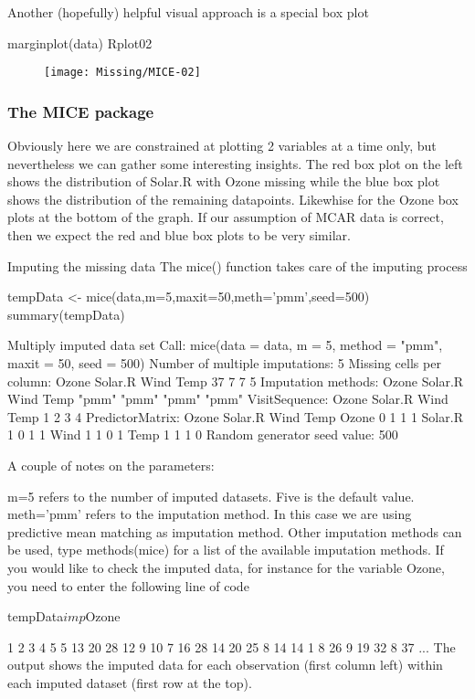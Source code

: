 \begin{frame}

Another (hopefully) helpful visual approach is a special box plot

marginplot(data)
Rplot02
\begin{figure}
\centering
\texttt{[image: Missing/MICE-02]}
\caption{}
\label{fig:MICE-02}
\end{figure}


\end{frame}
\begin{frame}[fragile]
	\frametitle{The MICE package}
	\Large
Obviously here we are constrained at plotting 2 variables at a time only, but nevertheless we can gather some interesting insights.
The red box plot on the left shows the distribution of Solar.R with Ozone missing while the blue box plot shows the distribution of the remaining datapoints. Likewhise for the Ozone box plots at the bottom of the graph.
If our assumption of MCAR data is correct, then we expect the red and blue box plots to be very similar.

\end{frame}
\begin{frame}

Imputing the missing data
The mice() function takes care of the imputing process

tempData <- mice(data,m=5,maxit=50,meth='pmm',seed=500)
summary(tempData)

Multiply imputed data set
Call:
mice(data = data, m = 5, method = "pmm", maxit = 50, seed = 500)
Number of multiple imputations:  5
Missing cells per column:
  Ozone Solar.R    Wind    Temp 
     37       7       7       5 
Imputation methods:
  Ozone Solar.R    Wind    Temp 
  "pmm"   "pmm"   "pmm"   "pmm" 
VisitSequence:
  Ozone Solar.R    Wind    Temp 
      1       2       3       4 
PredictorMatrix:
        Ozone Solar.R Wind Temp
Ozone       0       1    1    1
Solar.R     1       0    1    1
Wind        1       1    0    1
Temp        1       1    1    0
Random generator seed value:  500 
\end{frame}
\begin{frame}[fragile]
A couple of notes on the parameters:

m=5 refers to the number of imputed datasets. Five is the default value.
meth='pmm' refers to the imputation method. In this case we are using predictive mean matching as imputation method. Other imputation methods can be used, type methods(mice) for a list of the available imputation methods.
If you would like to check the imputed data, for instance for the variable Ozone, you need to enter the following line of code

tempData$imp$Ozone

      1  2   3   4   5
5    13 20  28  12   9
10    7 16  28  14  20
25    8 14  14   1   8
26    9 19  32   8  37
...
The output shows the imputed data for each observation (first column left) within each imputed dataset (first row at the top).
\end{frame}
